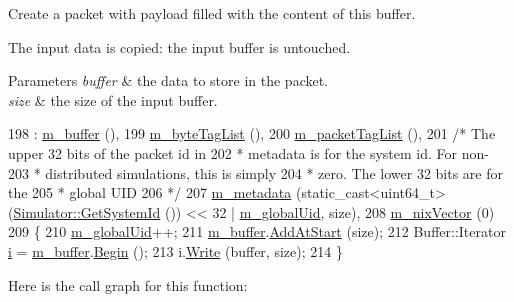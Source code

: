 Create a packet with payload filled with the content of this buffer. 

The input data is copied\+: the input buffer is untouched.


\begin{DoxyParams}{Parameters}
{\em buffer} & the data to store in the packet. \\
\hline
{\em size} & the size of the input buffer. \\
\hline
\end{DoxyParams}

\begin{DoxyCode}
198   : \hyperlink{classns3_1_1Packet_a0f17bc9b4177865c9fe48fc927d57996}{m\_buffer} (),
199     \hyperlink{classns3_1_1Packet_a29e08c3cc4220a80366eea801c00e4ba}{m\_byteTagList} (),
200     \hyperlink{classns3_1_1Packet_a7c91fc548c7cfddf27c176e13bd858ff}{m\_packetTagList} (),
201     \textcolor{comment}{/* The upper 32 bits of the packet id in }
202 \textcolor{comment}{     * metadata is for the system id. For non-}
203 \textcolor{comment}{     * distributed simulations, this is simply }
204 \textcolor{comment}{     * zero.  The lower 32 bits are for the }
205 \textcolor{comment}{     * global UID}
206 \textcolor{comment}{     */}
207     \hyperlink{classns3_1_1Packet_af3f95fba7966191bd152bcedd5fbcd6b}{m\_metadata} (static\_cast<uint64\_t> (\hyperlink{classns3_1_1Simulator_ac956436096243081b306fe4d95040d42}{Simulator::GetSystemId} ()) << 32 | 
      \hyperlink{classns3_1_1Packet_a4f707aab2b31689f8d1dadaed31e7c82}{m\_globalUid}, size),
208     \hyperlink{classns3_1_1Packet_af6fe17f2fb778ccd84af5c3c950ee4f4}{m\_nixVector} (0)
209 \{
210   \hyperlink{classns3_1_1Packet_a4f707aab2b31689f8d1dadaed31e7c82}{m\_globalUid}++;
211   \hyperlink{classns3_1_1Packet_a0f17bc9b4177865c9fe48fc927d57996}{m\_buffer}.\hyperlink{classns3_1_1Buffer_a8abd8164c3671d3dadc98fc66fade7b1}{AddAtStart} (size);
212   Buffer::Iterator \hyperlink{bernuolliDistribution_8m_a6f6ccfcf58b31cb6412107d9d5281426}{i} = \hyperlink{classns3_1_1Packet_a0f17bc9b4177865c9fe48fc927d57996}{m\_buffer}.\hyperlink{classns3_1_1Buffer_a893d4bf50df13e730b6cd0fda91b967f}{Begin} ();
213   i.\hyperlink{classns3_1_1Buffer_1_1Iterator_a087b4e6b5d038544c750c741e8932d69}{Write} (buffer, size);
214 \}
\end{DoxyCode}


Here is the call graph for this function\+:


